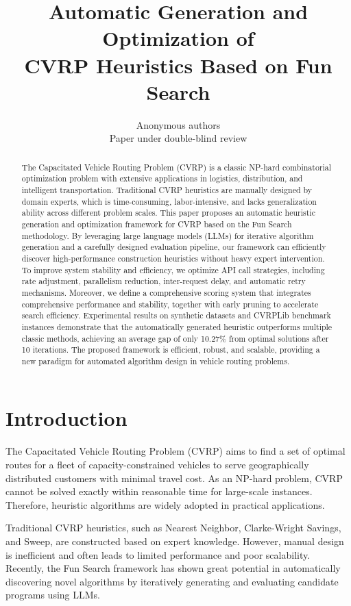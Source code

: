 \documentclass{article}
\title{Automatic Generation and Optimization of\\CVRP Heuristics Based on Fun Search}
\author{Anonymous authors \\
Paper under double-blind review}
\begin{document}
\maketitle

\begin{abstract}
The Capacitated Vehicle Routing Problem (CVRP) is a classic NP-hard combinatorial optimization problem with extensive applications in logistics, distribution, and intelligent transportation. Traditional CVRP heuristics are manually designed by domain experts, which is time-consuming, labor-intensive, and lacks generalization ability across different problem scales. This paper proposes an automatic heuristic generation and optimization framework for CVRP based on the Fun Search methodology. By leveraging large language models (LLMs) for iterative algorithm generation and a carefully designed evaluation pipeline, our framework can efficiently discover high-performance construction heuristics without heavy expert intervention. To improve system stability and efficiency, we optimize API call strategies, including rate adjustment, parallelism reduction, inter-request delay, and automatic retry mechanisms. Moreover, we define a comprehensive scoring system that integrates comprehensive performance and stability, together with early pruning to accelerate search efficiency. Experimental results on synthetic datasets and CVRPLib benchmark instances demonstrate that the automatically generated heuristic outperforms multiple classic methods, achieving an average gap of only 10.27\% from optimal solutions after 10 iterations. The proposed framework is efficient, robust, and scalable, providing a new paradigm for automated algorithm design in vehicle routing problems.
\end{abstract}

\section{Introduction}

The Capacitated Vehicle Routing Problem (CVRP) aims to find a set of optimal routes for a fleet of capacity-constrained vehicles to serve geographically distributed customers with minimal travel cost. As an NP-hard problem, CVRP cannot be solved exactly within reasonable time for large-scale instances. Therefore, heuristic algorithms are widely adopted in practical applications.

Traditional CVRP heuristics, such as Nearest Neighbor, Clarke-Wright Savings, and Sweep, are constructed based on expert knowledge. However, manual design is inefficient and often leads to limited performance and poor scalability. Recently, the Fun Search framework has shown great potential in automatically discovering novel algorithms by iteratively generating and evaluating candidate programs using LLMs.
\end{document}

